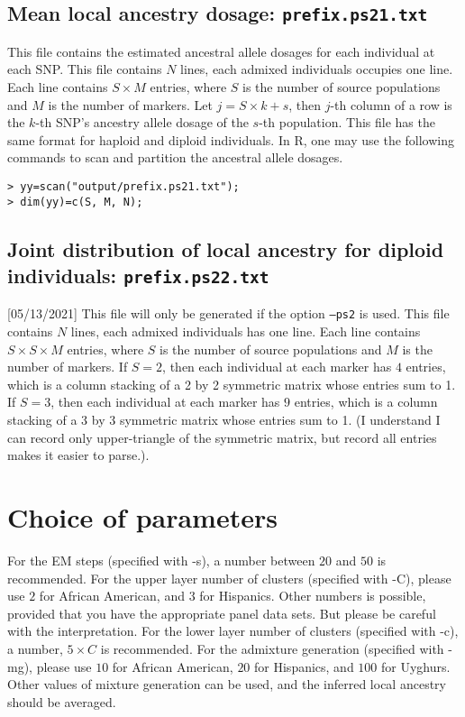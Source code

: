 \documentclass[11pt,Palatino]{article}
\begin{document}
\subsection{Mean local ancestry dosage: {\tt prefix.ps21.txt}}
This file contains the estimated ancestral allele dosages for each individual at each SNP. 
This file contains $N$ lines, each admixed individuals occupies one line.  
Each line contains $S\times M$ entries, where $S$ is the number of source populations and $M$ is the number of markers.  
Let $j = S\times k + s$, then $j$-th column of a row is the $k$-th SNP's ancestry allele dosage of the $s$-th population.   
This file has the same format for haploid and diploid individuals. In R, one may use the following commands to scan and partition the ancestral allele dosages. 
\begin{verbatim}
> yy=scan("output/prefix.ps21.txt"); 
> dim(yy)=c(S, M, N);  
\end{verbatim}


\subsection{Joint distribution of local ancestry for diploid individuals: {\tt prefix.ps22.txt}} [05/13/2021]
This file will only be generated if the option {\tt --ps2} is used. 
This file contains $N$ lines, each admixed individuals has one line.  
Each line contains $S\times S \times M$ entries, where $S$ is the number of source populations and $M$ is the number of markers.  
If $S=2$, then each individual at each marker has $4$ entries, which is a column stacking of a 2 by 2 symmetric matrix whose entries sum to 1.  
If $S=3$, then each individual at each marker has $9$ entries, which is a column stacking of a 3 by 3 symmetric matrix whose entries sum to 1.  
(I understand I can record only upper-triangle of the symmetric matrix, but record all entries makes it easier to parse.). 

\section{Choice of parameters}
For the EM steps (specified with -s), a number between $20$ and $50$ is recommended. 
For the upper layer number of clusters (specified with -C), please use $2$ for African American, and $3$ for Hispanics. Other numbers is possible, provided that you have the appropriate panel data sets. But please be careful with the interpretation. 
For the lower layer number of clusters (specified with -c), a number, $5\times C$ is recommended. 
For the admixture generation (specified with -mg), please use $10$ for African American, $20$ for Hispanics, and $100$ for Uyghurs. Other values of mixture generation can be used, and the inferred local ancestry should be averaged.  
\end{document}

